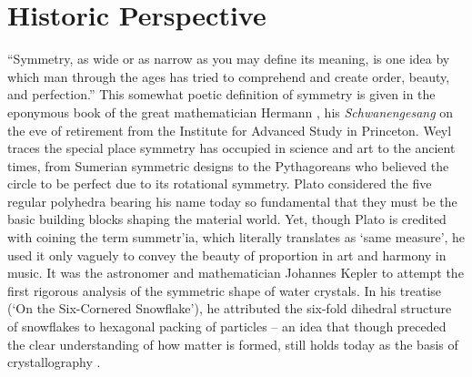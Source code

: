\section{Historic Perspective} 

``Symmetry, as wide or as narrow as you may define its meaning, is one idea by which man through the ages has tried to comprehend and create order, beauty, and perfection.'' 
%
This somewhat poetic definition of symmetry is given in the eponymous book of the great mathematician Hermann \citet{weyl2015symmetry}, his {\em Schwanengesang} on the eve of retirement from the Institute for Advanced Study in Princeton. 
%
Weyl traces the special place symmetry has occupied in science and art to the ancient times, from Sumerian symmetric designs to the Pythagoreans who believed the circle to be perfect due to its rotational symmetry. 
%
Plato considered the five regular polyhedra bearing his name today  so fundamental that they must be the basic building blocks shaping the material world. 
%
Yet, though Plato is credited with coining the term \textgreek{summetr'ia}, which literally translates as `same measure', he used it only vaguely to convey the beauty of proportion in art and harmony in music. 
%
It was the astronomer and mathematician Johannes Kepler to attempt the first rigorous analysis of the symmetric shape of water crystals. In his treatise (`On the Six-Cornered Snowflake'), he attributed the six-fold dihedral structure of snowflakes to hexagonal packing of particles -- an idea that though preceded the clear understanding of how matter is formed, still holds today as the basis of crystallography \citep{ball2011retrospect}. 




